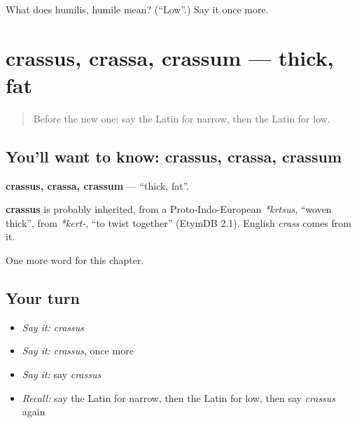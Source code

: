 \begin{tcolorbox}[breakable,colback=teal!4,colframe=teal!35!black,title={Before you move on}]
What does humilis, humile mean? (\textquotedblleft{}Low\textquotedblright{}.) Say it once more.
\end{tcolorbox}
\section[crassus, crassa, crassum]{crassus, crassa, crassum — thick, fat}

\label{lesson:LA-C144-crassus}



\begin{quote}
Before the new one: say the Latin for narrow, then the Latin for low.
\end{quote}

\subsection*{You'll want to know: crassus, crassa, crassum}
\textbf{crassus, crassa, crassum} — \textquotedblleft{}thick, fat\textquotedblright{}.

\begin{cousinweb}
\textbf{crassus} is probably inherited, from a Proto-Indo-European \emph{*krtsus}, \textquotedblleft{}woven thick\textquotedblright{}, from \emph{*kert-}, \textquotedblleft{}to twist together\textquotedblright{} (EtymDB 2.1). English \emph{crass} comes from it.
\end{cousinweb}

\begin{grammarlens}[title={What you've built}]
One more word for this chapter.
\end{grammarlens}

\subsection*{Your turn}
\begin{itemize}
\raggedright
  \item \emph{Say it:} \emph{crassus}
  \item \emph{Say it:} \emph{crassus}, once more
  \item \emph{Say it:} say \emph{crassus}
  \item \emph{Recall:} say the Latin for narrow, then the Latin for low, then say \emph{crassus} again
\end{itemize}

